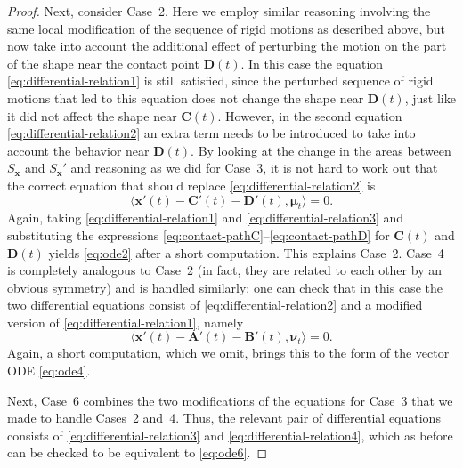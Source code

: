 \documentclass[11pt]{article}
\newcommand{\nvecone}{\boldsymbol{\mu}}
\newcommand{\nvectwo}{\boldsymbol{\nu}}
\begin{document}
\begin{proof}
Next, consider Case~2. Here we employ similar reasoning involving the same local modification of the sequence of rigid motions as described above, but now take into account the additional effect of perturbing the motion on the part of the shape near the contact point $\mathbf{D}(t)$. In this case the equation \eqref{eq:differential-relation1} is still satisfied, since the perturbed sequence of rigid motions that led to this equation does not change the shape near $\mathbf{D}(t)$, just like it did not affect the shape near $\mathbf{C}(t)$. However, in the second equation \eqref{eq:differential-relation2} an extra term needs to be introduced to take into account the behavior near $\mathbf{D}(t)$. By looking at the change in the areas between $S_\mathbf{x}$ and $S_\mathbf{x}'$ and reasoning as we did for Case~3, it is not hard to work out that the correct equation that should replace \eqref{eq:differential-relation2} is
\begin{equation} \label{eq:differential-relation3}
\Big\langle \mathbf{x}'(t) - \mathbf{C}'(t)  - \mathbf{D}'(t), \nvecone_t \Big\rangle  = 0.
\end{equation}
Again, taking \eqref{eq:differential-relation1} and \eqref{eq:differential-relation3} and substituting the expressions \eqref{eq:contact-pathC}--\eqref{eq:contact-pathD} for $\mathbf{C}(t)$ and $\mathbf{D}(t)$ yields \eqref{eq:ode2} after a short computation. This explains Case~2. Case~4 is completely analogous to Case~2 (in fact, they are related to each other by an obvious symmetry) and is handled similarly; one can check that in this case the two differential equations consist of \eqref{eq:differential-relation2} and a modified version of \eqref{eq:differential-relation1}, 
namely
\begin{equation} \label{eq:differential-relation4}
\Big\langle \mathbf{x}'(t) - \mathbf{A}'(t) - \mathbf{B}'(t), \nvectwo_t \Big\rangle  = 0.
\end{equation}
Again, a short computation, which we omit, brings this to the form of the vector ODE \eqref{eq:ode4}.

Next, Case~6 combines the two modifications of the equations for Case~3 that we made to handle Cases~2 and~4. Thus, the relevant pair of differential equations consists of \eqref{eq:differential-relation3} and \eqref{eq:differential-relation4}, which as before can be checked to be equivalent to \eqref{eq:ode6}.


\end{proof}
\end{document}

